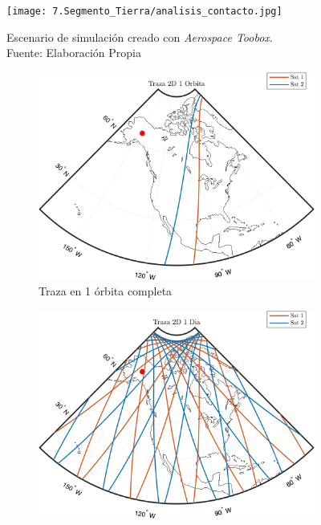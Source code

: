 \begin{figure}[H]
    \centering
    \texttt{[image: 7.Segmento\_Tierra/analisis\_contacto.jpg]}
    \caption{Escenario de simulación creado con \textit{Aerospace Toobox}. \\Fuente: Elaboración Propia}
\end{figure}

\begin{figure}[H]
    \centering
    \begin{subfigure}[b]{0.3\textwidth}
        \centering
        \includegraphics[width=\textwidth]{7.Segmento_Tierra/Traza 2D 1 Orbita.jpg}
        \caption{Traza en 1 órbita completa }
        \label{fig:traza1}
    \end{subfigure}
    \hfill
    \begin{subfigure}[b]{0.3\textwidth}
        \centering
        \includegraphics[width=\textwidth]{7.Segmento_Tierra/Traza 2D 1 Dia.jpg}

\end{subfigure}
\end{figure}
